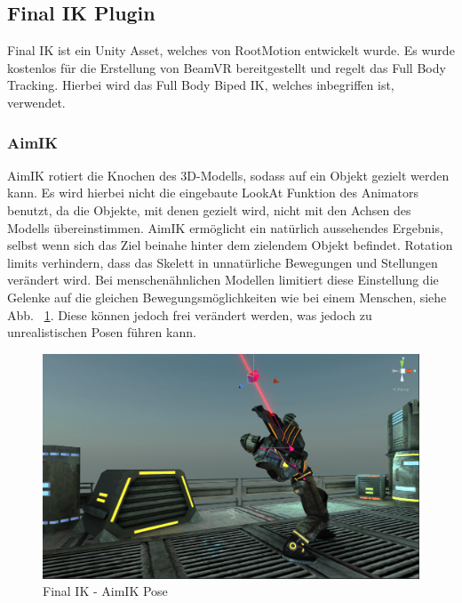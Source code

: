 \begin{itemize}





\subsection{Final IK Plugin}\label{subsec:final-ik-plugin}

Final IK ist ein Unity Asset, welches von RootMotion entwickelt wurde.
Es wurde kostenlos für die Erstellung von BeamVR bereitgestellt und regelt das Full Body Tracking.
Hierbei wird das Full Body Biped IK, welches inbegriffen ist, verwendet.
~\cite{FinalIK_Overview_2020}

\subsubsection{AimIK}
AimIK rotiert die Knochen des 3D-Modells, sodass auf ein Objekt gezielt werden kann.
Es wird hierbei nicht die eingebaute LookAt Funktion des Animators benutzt, da die Objekte, mit denen gezielt wird, nicht mit den Achsen des Modells übereinstimmen.
AimIK ermöglicht ein natürlich aussehendes Ergebnis, selbst wenn sich das Ziel beinahe hinter dem zielendem Objekt befindet.
Rotation limits verhindern, dass das Skelett in unnatürliche Bewegungen und Stellungen verändert wird.
Bei menschenähnlichen Modellen limitiert diese Einstellung die Gelenke auf die gleichen Bewegungsmöglichkeiten wie bei einem Menschen, siehe Abb. ~\ref{fig:finalIK_aimIK_pose}.
Diese können jedoch frei verändert werden, was jedoch zu unrealistischen Posen führen kann.
\begin {figure}
    \centering
    \includegraphics[scale=0.4]{pics/finalik_aimik_pose}
    \caption{Final IK - AimIK Pose}
    \label{fig:finalIK_aimIK_pose}
\end {figure}


\end{itemize}
